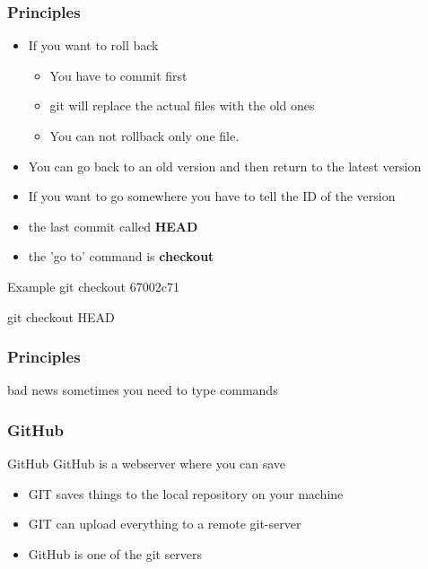 \documentclass[aspectratio=169]{beamer}
\begin{document}
\begin{frame}
\frametitle<presentation>{Principles}

\begin{itemize}
  		\item If you want to roll back 
	  		\begin{itemize}
	  		\item You have to commit first
	  		\item git will replace the actual files with the old ones
			\item You can not rollback only one file. 
			\end{itemize}
  		\item You can go back to an old version and then return to the latest version 
  		\item If you want to go somewhere you have to tell the ID of the version 
  		\item the last commit called \textbf{HEAD}
  		\item the 'go to' command is \textbf{checkout}
	\end{itemize}

\begin{block}{Example}
		git checkout 67002c71
	\end{block}
  
  \begin{block}{}
		git checkout HEAD
	\end{block}
  
\end{frame}

\begin{frame}
\frametitle<presentation>{Principles}

\begin{block}{bad news}
		sometimes you need to type commands
\end{block}
\end{frame}

   
\begin{frame}
\frametitle<presentation>{GitHub}



\begin{block}{GitHub}
GitHub is a webserver where you can save 
\end{block}

\begin{itemize}
\item GIT saves things to the local repository on your machine
\item GIT can upload everything to a remote git-server
\item GitHub is one of the git servers
\end{itemize}
 
\end{frame}
\end{document}
